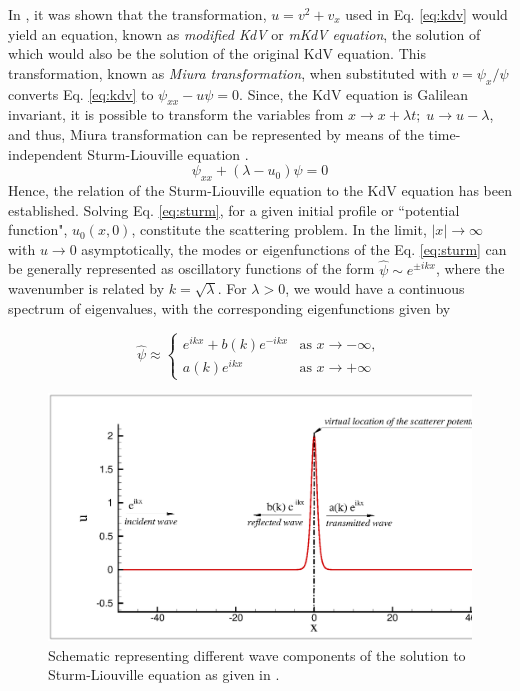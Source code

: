 In \cite{Miura1968}, it was shown that the transformation, $u = v^2 + v_x$ used in Eq. \eqref{eq:kdv} would yield an equation, known as \emph{modified KdV} or \emph{mKdV equation}, the solution of which would also be the solution of the original KdV equation. This transformation, known as \emph{Miura transformation}, when substituted with $v = {\psi_x}/{\psi}$ converts Eq. \eqref{eq:kdv} to $\psi_{xx}-u\psi=0$. Since, the KdV equation is Galilean invariant, it is possible to transform the variables from $ x \to x+\lambda t;\; u \to u - \lambda$, and thus, Miura transformation can be represented by means of the time-independent Sturm-Liouville equation \cite[pp. 64-66]{Drazin1989}.
\begin{equation}
\label{eq:sturm}
\psi_{xx} + (\lambda - u_0) \psi = 0
\end{equation}
Hence, the relation of the Sturm-Liouville equation to the KdV equation has been established. Solving Eq. \eqref{eq:sturm}, for a given initial profile or ``potential function", $u_0(x,0)$, constitute the scattering problem. In the limit, $|x| \to \infty$ with $u \to 0$ asymptotically, the modes or eigenfunctions of the Eq. \eqref{eq:sturm} can be generally represented as oscillatory functions of the form $\hat{\psi} \sim e^{\pm ikx}$, where the wavenumber is related by $k=\sqrt{\lambda}$. For $\lambda>0$, we would have a continuous spectrum of eigenvalues, with the corresponding eigenfunctions given by

\begin{equation*}
\label{eq:sturm_bc}
\hat{\psi} \approx
\begin{cases}
e^{ikx} + b(k)e^{-ikx} & \text{as } x \to -\infty,\\
a(k)e^{ikx} & \text{as } x \to +\infty
\end{cases}
\end{equation*}

\begin{figure}[h!]
\center
 \includegraphics[width=0.9\linewidth]{Fig_1}
  \caption{Schematic representing different wave components of the solution to Sturm-Liouville equation as given in \cite{Drazin1989}.}
  \label{fig:scatter}
\end{figure}

